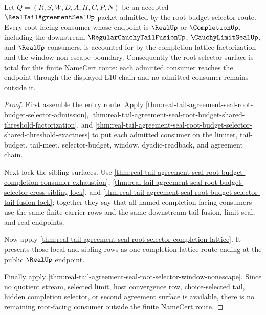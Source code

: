 \begin{theorem}
\label{thm:real-tail-agreement-seal-root-selector-consumer-totality}
Let $Q=(R,S,W,D,A,H,C,P,N)$ be an accepted $\RealTailAgreementSealUp$ packet admitted by the root budget-selector route. Every root-facing consumer whose endpoint is $\RealUp$ or $\CompletionUp$, including the downstream $\RegularCauchyTailFusionUp$, $\CauchyLimitSealUp$, and $\RealUp$ consumers, is accounted for by the completion-lattice factorization and the window non-escape boundary. Consequently the root selector surface is total for this finite NameCert route: each admitted consumer reaches the endpoint through the displayed L10 chain and no admitted consumer remains outside it.
\end{theorem}
\begin{proof}
First assemble the entry route. Apply \autoref{thm:real-tail-agreement-seal-root-budget-selector-admission}, \autoref{thm:real-tail-agreement-seal-root-budget-shared-threshold-factorization}, and \autoref{thm:real-tail-agreement-seal-root-budget-selector-shared-threshold-exactness} to put each admitted consumer on the limiter, tail-budget, tail-meet, selector-budget, window, dyadic-readback, and agreement chain.

Next lock the sibling surfaces. Use \autoref{thm:real-tail-agreement-seal-root-budget-completion-consumer-exhaustion}, \autoref{thm:real-tail-agreement-seal-root-budget-selector-cross-sibling-lock}, and \autoref{thm:real-tail-agreement-seal-root-budget-selector-tail-fusion-lock}; together they say that all named completion-facing consumers use the same finite carrier rows and the same downstream tail-fusion, limit-seal, and real endpoints.

Now apply \autoref{thm:real-tail-agreement-seal-root-selector-completion-lattice}. It presents those local and sibling rows as one completion-lattice route ending at the public $\RealUp$ endpoint.

Finally apply \autoref{thm:real-tail-agreement-seal-root-selector-window-nonescape}. Since no quotient stream, selected limit, host convergence row, choice-selected tail, hidden completion selector, or second agreement surface is available, there is no remaining root-facing consumer outside the finite NameCert route.
\end{proof}

